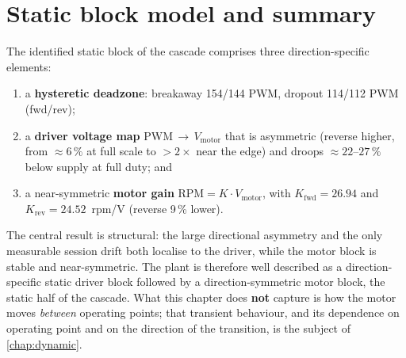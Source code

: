 \section{Static block model and summary}
\label{sec:static-summary}

The identified static block of the cascade comprises three direction-specific elements:
\begin{enumerate}
  \item a \textbf{hysteretic deadzone}: breakaway 154/144 PWM, dropout 114/112 PWM (fwd/rev);
  \item a \textbf{driver voltage map} PWM\,$\to$\,$V_{\mathrm{motor}}$ that is asymmetric (reverse higher, from ${\approx}6\,\%$ at full scale to ${>}2\times$ near the edge) and droops ${\approx}22$--$27\,\%$ below supply at full duty; and
  \item a near-symmetric \textbf{motor gain} $\mathrm{RPM} = K\cdot V_{\mathrm{motor}}$, with $K_{\mathrm{fwd}} = 26.94$ and $K_{\mathrm{rev}} = 24.52$~rpm/V (reverse 9\,\% lower).
\end{enumerate}

The central result is structural: the large directional asymmetry and the only measurable session drift both localise to the driver, while the motor block is stable and near-symmetric. The plant is therefore well described as a direction-specific static driver block followed by a direction-symmetric motor block, the static half of the cascade. What this chapter does \textbf{not} capture is how the motor moves \emph{between} operating points; that transient behaviour, and its dependence on operating point and on the direction of the transition, is the subject of \cref{chap:dynamic}.

